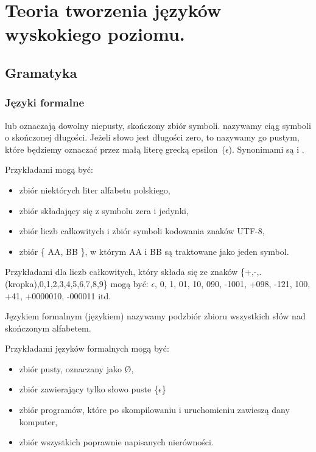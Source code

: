 \chapter{Teoria tworzenia języków wyskokiego poziomu. }

\section{Gramatyka}
\subsection{Języki formalne}
 lub  oznaczają dowolny niepusty, skończony zbiór symboli. 
 nazywamy ciąg symboli  o skończonej długości.
Jeżeli słowo jest długości zero, to nazywamy go  pustym,
  które będziemy oznaczać przez małą literę grecką epsilon~($\epsilon$).
  Synonimami  są  i . \cite{aho}   

  Przykładami  mogą być:
    \begin{itemize}
     \item  zbiór niektórych liter alfabetu polskiego,
     \item  zbiór składający się z symbolu zera i jedynki,
     \item  zbiór liczb całkowitych i zbiór symboli kodowania znaków UTF-8,
     \item  zbiór \{ AA, BB \}, w którym AA i BB są traktowane jako jeden symbol.
    \end{itemize}

  Przykładami   dla  liczb całkowitych, który składa się ze znaków \{+,-,.(kropka),0,1,2,3,4,5,6,7,8,9\} mogą być:
  $\epsilon$, 0, 1, 01, 10, 090, -1001, +098, -121, 100, +41, +0000010, -000011
itd.
  
Językiem formalnym (językiem) nazywamy podzbiór zbioru wszystkich słów nad skończonym alfabetem.
    
Przykładami języków formalnych mogą być:
\begin{itemize}
 \item zbiór pusty, oznaczany jako \O,
 \item zbiór zawierający tylko słowo puste  \{$\epsilon$\}
 \item zbiór programów, które po skompilowaniu i uruchomieniu zawieszą dany komputer,
 \item zbiór wszystkich poprawnie napisanych nierówności.
\end{itemize}

